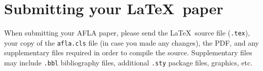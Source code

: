 \documentclass{afla}
\begin{document}
\section{Submitting your \LaTeX\ paper}

When submitting your AFLA paper, please send the \LaTeX\ source file (\verb`.tex`), your copy of the \verb`afla.cls` file (in case you made any changes), the PDF, and any supplementary files required in order to compile the source. Supplementary files may include \verb`.bbl` bibliography files, additional \verb`.sty` package files, graphics, etc.


\end{document}

